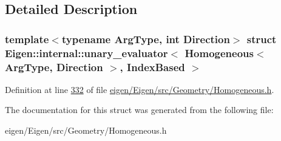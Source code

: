 \subsection{Detailed Description}
\subsubsection*{template$<$typename Arg\+Type, int Direction$>$\newline
struct Eigen\+::internal\+::unary\+\_\+evaluator$<$ Homogeneous$<$ Arg\+Type, Direction $>$, Index\+Based $>$}



Definition at line \hyperlink{eigen_2_eigen_2src_2_geometry_2_homogeneous_8h_source_l00332}{332} of file \hyperlink{eigen_2_eigen_2src_2_geometry_2_homogeneous_8h_source}{eigen/\+Eigen/src/\+Geometry/\+Homogeneous.\+h}.



The documentation for this struct was generated from the following file\+:\begin{DoxyCompactItemize}
\item 
eigen/\+Eigen/src/\+Geometry/\+Homogeneous.\+h\end{DoxyCompactItemize}
